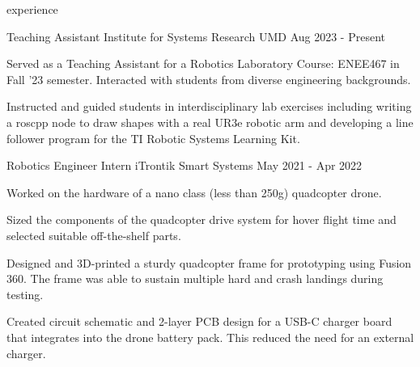 \begin{section}{experience}

  \begin{work}
    {Teaching Assistant}
    {Institute for Systems Research}
    {UMD}
    {Aug 2023 - Present}

    \item Served as a Teaching Assistant for a Robotics Laboratory Course:
          ENEE467 in Fall '23 semester. Interacted with students from
          diverse engineering backgrounds.

    \item Instructed and guided students in interdisciplinary lab exercises
          including writing a roscpp node to draw shapes with a real UR3e
          robotic arm and developing a line follower program for the TI Robotic
          Systems Learning Kit.


  
  \end{work}

  \begin{work}
    {Robotics Engineer Intern}
    {iTrontik Smart Systems}
    {}
    {May 2021 - Apr 2022}

    \item Worked on the hardware of a nano class (less than 250g) quadcopter drone.
    \item Sized the components of the quadcopter drive system for hover flight time and selected suitable off-the-shelf parts. 
    \item Designed and 3D-printed a sturdy quadcopter frame for prototyping using Fusion 360. 
          The frame was able to sustain multiple hard and crash landings during testing.
    \item Created circuit schematic and 2-layer PCB design for a USB-C charger board that integrates into
          the drone battery pack. This reduced the need for an external charger.
  
  \end{work}

\end{section}